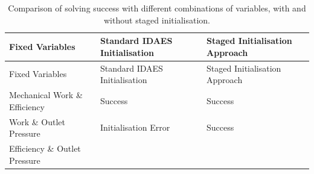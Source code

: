 \begin{longtable}[]{@{}lll@{}}
\caption{Comparison of solving success with different combinations of
variables, with and without staged initialisation.}\tabularnewline
\toprule
\begin{minipage}[b]{0.19\columnwidth}\raggedright
Fixed Variables\strut
\end{minipage} & \begin{minipage}[b]{0.36\columnwidth}\raggedright
Standard IDAES Initialisation\strut
\end{minipage} & \begin{minipage}[b]{0.37\columnwidth}\raggedright
Staged Initialisation Approach\strut
\end{minipage}\tabularnewline
\midrule
\endfirsthead
\toprule
\begin{minipage}[b]{0.19\columnwidth}\raggedright
Fixed Variables\strut
\end{minipage} & \begin{minipage}[b]{0.36\columnwidth}\raggedright
Standard IDAES Initialisation\strut
\end{minipage} & \begin{minipage}[b]{0.37\columnwidth}\raggedright
Staged Initialisation Approach\strut
\end{minipage}\tabularnewline
\midrule
\endhead
\begin{minipage}[t]{0.19\columnwidth}\raggedright
Mechanical Work \& Efficiency\strut
\end{minipage} & \begin{minipage}[t]{0.36\columnwidth}\raggedright
Success\strut
\end{minipage} & \begin{minipage}[t]{0.37\columnwidth}\raggedright
Success\strut
\end{minipage}\tabularnewline
\begin{minipage}[t]{0.19\columnwidth}\raggedright
Work \& Outlet Pressure\strut
\end{minipage} & \begin{minipage}[t]{0.36\columnwidth}\raggedright
Initialisation Error\strut
\end{minipage} & \begin{minipage}[t]{0.37\columnwidth}\raggedright
Success\strut
\end{minipage}\tabularnewline
\begin{minipage}[t]{0.19\columnwidth}\raggedright
Efficiency \& Outlet Pressure\strut
\end{minipage} & \begin{minipage}[t]{0.36\columnwidth}\raggedright

\end{minipage}
\end{longtable}
